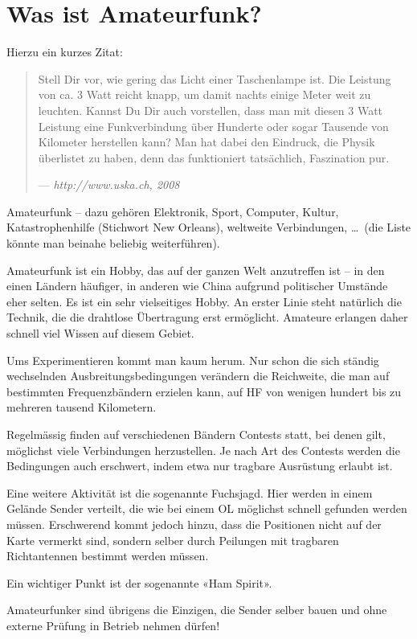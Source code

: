 \chapter{Was ist Amateurfunk?}
Hierzu ein kurzes Zitat:
\begin{quotation}
 Stell Dir vor, wie gering das Licht einer Taschenlampe ist. Die Leistung von ca. 3 Watt reicht knapp, um damit nachts einige Meter weit zu leuchten. Kannst Du Dir auch vorstellen, dass man mit diesen 3 Watt Leistung eine Funkverbindung über Hunderte oder sogar Tausende von Kilometer herstellen kann? Man hat dabei den Eindruck, die Physik überlistet zu haben, denn das funktioniert tatsächlich, Faszination pur.
 
 \hspace{\fill} --- \textit{http://www.uska.ch, 2008}
\end{quotation}


Amateurfunk – dazu gehören Elektronik, Sport, Computer, Kultur, Katastrophenhilfe (Stichwort New Orleans), weltweite Verbindungen, \dots\ (die Liste könnte man beinahe beliebig weiterführen).

Amateurfunk ist ein Hobby, das auf der ganzen Welt anzutreffen ist – in den einen Ländern häufiger, in anderen wie China aufgrund politischer Umstände eher selten. Es ist ein sehr vielseitiges Hobby. An erster Linie steht natürlich die Technik, die die drahtlose Übertragung erst ermöglicht. Amateure erlangen daher schnell viel Wissen auf diesem Gebiet.

Ums Experimentieren kommt man kaum herum. Nur schon die sich ständig wechselnden Ausbreitungsbedingungen verändern die Reichweite, die man auf bestimmten Frequenzbändern erzielen kann, auf HF von wenigen hundert bis zu mehreren tausend Kilometern.

Regelmässig finden auf verschiedenen Bändern Contests statt, bei denen gilt, möglichst viele Verbindungen herzustellen. Je nach Art des Contests werden die Bedingungen auch erschwert, indem etwa nur tragbare Ausrüstung erlaubt ist.

Eine weitere Aktivität ist die sogenannte Fuchsjagd. Hier werden in einem Gelände Sender verteilt, die wie bei einem OL möglichst schnell gefunden werden müssen. Erschwerend kommt jedoch hinzu, dass die Positionen nicht auf der Karte vermerkt sind, sondern selber durch Peilungen mit tragbaren Richtantennen bestimmt werden müssen.

Ein wichtiger Punkt ist der sogenannte «Ham Spirit».

Amateurfunker sind übrigens die Einzigen, die Sender selber bauen und ohne externe Prüfung in Betrieb nehmen dürfen!

